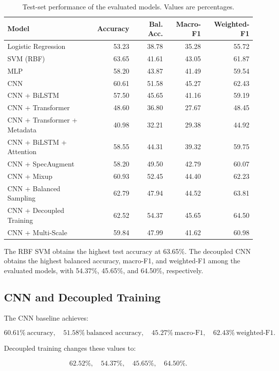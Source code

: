 \documentclass[11pt,a4paper]{article}
\begin{document}
\begin{table}[H]
\centering
\caption{Test-set performance of the evaluated models. Values are percentages.}
\label{tab:main_results}
\small
\begin{tabular}{lrrrr}
\toprule
Model & Accuracy & Bal. Acc. & Macro-F1 & Weighted-F1\\
\midrule
Logistic Regression & 53.23 & 38.78 & 35.28 & 55.72\\
SVM (RBF) & 63.65 & 41.61 & 43.05 & 61.87\\
MLP & 58.20 & 43.87 & 41.49 & 59.54\\
CNN & 60.61 & 51.58 & 45.27 & 62.43\\
CNN + BiLSTM & 57.50 & 45.65 & 41.16 & 59.19\\
CNN + Transformer & 48.60 & 36.80 & 27.67 & 48.45\\
CNN + Transformer + Metadata & 40.98 & 32.21 & 29.38 & 44.92\\
CNN + BiLSTM + Attention & 58.55 & 44.31 & 39.32 & 59.75\\
CNN + SpecAugment & 58.20 & 49.50 & 42.79 & 60.07\\
CNN + Mixup & 60.93 & 52.45 & 44.40 & 62.23\\
CNN + Balanced Sampling & 62.79 & 47.94 & 44.52 & 63.81\\
CNN + Decoupled Training & 62.52 & 54.37 & 45.65 & 64.50\\
CNN + Multi-Scale & 59.84 & 47.99 & 41.62 & 60.98\\
\bottomrule
\end{tabular}
\end{table}

The RBF SVM obtains the highest test accuracy at 63.65\%. The decoupled CNN obtains the highest balanced accuracy, macro-F1, and weighted-F1 among the evaluated models, with 54.37\%, 45.65\%, and 64.50\%, respectively.

\subsection{CNN and Decoupled Training}

The CNN baseline achieves:

\[
60.61\%\ \text{accuracy},\quad
51.58\%\ \text{balanced accuracy},\quad
45.27\%\ \text{macro-F1},\quad
62.43\%\ \text{weighted-F1}.
\]

Decoupled training changes these values to:

\[
62.52\%,\quad
54.37\%,\quad
45.65\%,\quad
64.50\%.
\]
\end{document}
